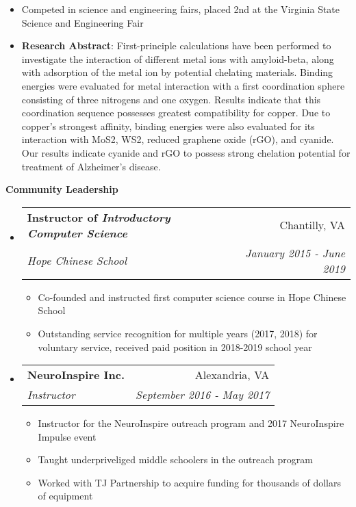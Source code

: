 \documentclass[letterpaper,11pt]{article}
\makeatletter
\newcommand{\resitem}[1]{\item #1 \vspace{-2pt}}
\newcommand{\resheading}[1]{{\large \colorbox{mygrey}{\begin{minipage}{\textwidth}{\textbf{#1 \vphantom{p\^{E}}}}\end{minipage}}}}
\newcommand{\ressubheading}[4]{
\begin{tabular*}{7.0in}{l@{\extracolsep{\fill}}r}
		\textbf{#1} & #2 \\
		\textit{#3} & \textit{#4} \\
\end{tabular*}\vspace{-6pt}}
\makeatother
\begin{document}
\begin{itemize}
\begin{itemize}
		\resitem{Competed in science and engineering fairs, placed 2nd at the Virginia State Science and Engineering Fair}
		\resitem{\textbf{Research Abstract}: \scriptsize{First-principle calculations have been performed to investigate the interaction of different metal ions with amyloid-beta, along with adsorption of the metal ion by potential chelating materials. Binding energies were evaluated for metal interaction with a first coordination sphere consisting of three nitrogens and one oxygen. Results indicate that this coordination sequence possesses greatest compatibility for copper. Due to copper's strongest affinity, binding energies were also evaluated for its interaction with MoS2, WS2, reduced graphene oxide (rGO), and cyanide. Our results indicate cyanide and rGO to possess strong chelation potential for treatment of Alzheimer's disease.}}
	\end{itemize}
	
\end{itemize}

\resheading{Community Leadership}
\begin{itemize}
\item
	\ressubheading{Instructor of \textit{Introductory Computer Science}}{Chantilly, VA}{Hope Chinese School}{January 2015 - June 2019}
	\begin{itemize}
	    \resitem{Co-founded and instructed first computer science course in Hope Chinese School}
	    \resitem{Outstanding service recognition for multiple years (2017, 2018) for voluntary service, received paid position in 2018-2019 school year}
	\end{itemize}
\item
	\ressubheading{NeuroInspire Inc.}{Alexandria, VA}{Instructor}{September 2016 - May 2017}
	\begin{itemize}
		\resitem{Instructor for the NeuroInspire outreach program and 2017 NeuroInspire Impulse event}
		\resitem{Taught underpriveliged middle schoolers in the outreach program}
		\resitem{Worked with TJ Partnership to acquire funding for thousands of dollars of equipment}
	\end{itemize}
	
\end{itemize}
\end{document}
